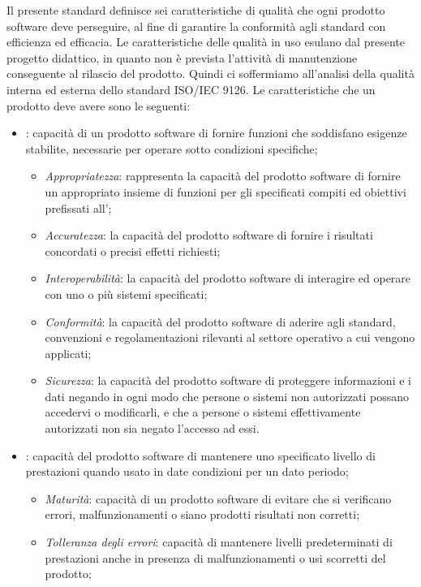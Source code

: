 Il presente standard definisce sei caratteristiche di qualità che ogni prodotto software deve perseguire, al fine di garantire la conformità agli standard con efficienza ed efficacia. Le caratteristiche delle qualità in uso esulano dal presente progetto didattico, in quanto non è prevista l'attività di manutenzione conseguente al rilascio del prodotto. Quindi ci soffermiamo all'analisi della qualità interna ed esterna dello standard ISO/IEC 9126.
Le caratteristiche che un prodotto deve avere sono le seguenti:

\begin{itemize}
\item {}: capacità di un prodotto software di fornire funzioni che soddisfano esigenze stabilite, necessarie per operare sotto condizioni specifiche;
\begin{itemize}
\item \emph{Appropriatezza}: rappresenta la capacità del prodotto software di fornire un appropriato insieme di funzioni per gli specificati compiti ed obiettivi prefissati all';
\item \emph{Accuratezza}: la capacità del prodotto software di fornire i risultati concordati o precisi effetti richiesti;
\item \emph{Interoperabilità}: la capacità del prodotto software di interagire ed operare con uno o più sistemi specificati;
\item \emph{Conformità}: la capacità del prodotto software di aderire agli standard, convenzioni e regolamentazioni rilevanti al settore operativo a cui vengono applicati;
\item \emph{Sicurezza}: la capacità del prodotto software di proteggere informazioni e i dati negando in ogni modo che persone o sistemi non autorizzati possano accedervi o modificarli, e che a persone o sistemi effettivamente autorizzati non sia negato l'accesso ad essi.
\end{itemize}
\item {}: capacità del prodotto software di mantenere uno specificato livello di prestazioni quando usato in date condizioni per un dato periodo;
\begin{itemize}
\item \emph{Maturità}: capacità di un prodotto software di evitare che si verificano errori, malfunzionamenti o siano prodotti risultati non corretti;
\item \emph{Tolleranza degli errori}: capacità di mantenere livelli predeterminati di prestazioni anche in presenza di malfunzionamenti o usi scorretti del prodotto;

\end{itemize}
\end{itemize}
